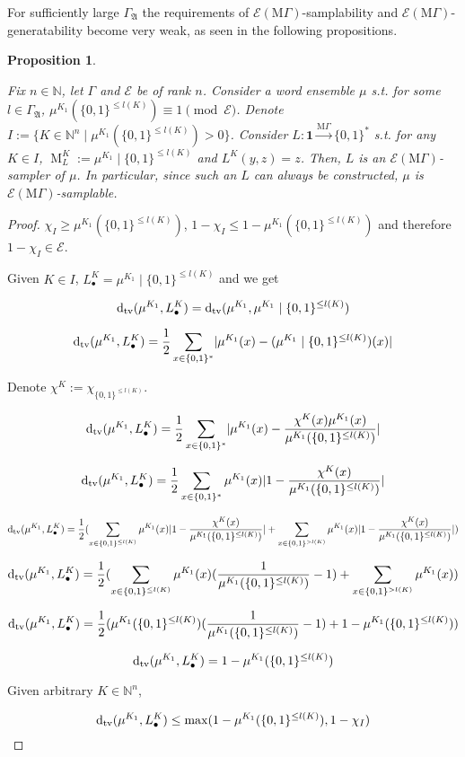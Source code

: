 \documentclass{article}
\numberwithin{equation}{section}
\theoremstyle{definition}
\theoremstyle{plain}
\newtheorem{proposition}{Proposition}[section]
\newcommand{\Bool}{\{0,1\}}
\newcommand{\Words}{{\Bool^*}}
\newcommand{\WordsLen}[1]{{\Bool^{#1}}}
\DeclareMathOperator{\M}{M}
\newcommand{\Dtv}{\operatorname{d}_{\textnormal{tv}}}
\newcommand{\Nats}{\mathbb{N}}
\newcommand{\Abs}[1]{\lvert #1 \rvert}
\newcommand{\GrowA}{\Gamma_{\mathfrak{A}}}
\newcommand{\MGrow}{\mathrm{M}\Gamma}
\newcommand{\Fall}{\mathcal{E}}
\newcommand{\MScheme}{\xrightarrow{\MGrow}}
\begin{document}
For sufficiently large $\GrowA$ the requirements of $\Fall(\MGrow)$-samplability and $\Fall(\MGrow)$-generatability become very weak, as seen in the following propositions.

\begin{samepage}
\begin{proposition}
\label{prp:adv_mgamma_smp}

Fix $n \in \Nats$, let $\Gamma$ and $\Fall$ be of rank $n$. Consider a word ensemble $\mu$ s.t. for some $l \in \GrowA$, $\mu^{K_1}(\Bool^{\leq l(K)}) \equiv 1 \pmod \Fall$. Denote ${I:=\{K \in \Nats^n \mid \mu^{K_1}(\Bool^{\leq l(K)}) > 0\}}$. Consider ${L: \bm{1} \MScheme \Words}$ s.t. for any $K \in I$, $\M_L^K:=\mu^{K_1} \mid \Bool^{\leq l(K)}$ and ${L^K(y,z)=z}$.  Then, $L$ is an $\Fall(\MGrow)$-sampler of $\mu$. In particular, since such an $L$ can always be constructed, $\mu$ is $\Fall(\MGrow)$-samplable.

\end{proposition}
\end{samepage}

\begin{proof}

$\chi_I \geq \mu^{K_1}(\Bool^{\leq l(K)})$, $1 - \chi_{I} \leq 1 - \mu^{K_1}(\Bool^{\leq l(K)})$ and therefore $1 - \chi_I \in \Fall$.

Given $K \in I$, ${L_\bullet^K = \mu^{K_1} \mid \Bool^{\leq l(K)}}$ and we get

$$\Dtv(\mu^{K_1}, L_\bullet^K) = \Dtv(\mu^{K_1}, \mu^{K_1} \mid \Bool^{\leq l(K)})$$

$$\Dtv(\mu^{K_1}, L_\bullet^K) = \frac{1}{2} \sum_{x \in \Words} \Abs{\mu^{K_1}(x)-(\mu^{K_1} \mid \WordsLen{\leq l(K)})(x)}$$

Denote $\chi^K:=\chi_{\WordsLen{\leq l(K)}}$.

$$\Dtv(\mu^{K_1}, L_\bullet^K) = \frac{1}{2} \sum_{x \in \Words} \Abs{\mu^{K_1}(x)-\frac{\chi^K(x)\mu^{K_1}(x)}{\mu^{K_1}(\WordsLen{\leq l(K)})}}$$

$$\Dtv(\mu^{K_1}, L_\bullet^K) = \frac{1}{2} \sum_{x \in \Words} \mu^{K_1}(x) \Abs{1-\frac{\chi^K(x)}{\mu^{K_1}(\Bool^{\leq l(K)})}}$$

$$\Dtv(\mu^{K_1}, L_\bullet^K) = \frac{1}{2} (\sum_{x \in \Bool^{\leq l(K)}} \mu^{K_1}(x) \Abs{1-\frac{\chi^K(x)}{\mu^{K_1}(\Bool^{\leq l(K)})}}+\sum_{x \in \Bool^{>l(K)}} \mu^{K_1}(x) \Abs{1-\frac{\chi^K(x)}{\mu^{K_1}(\Bool^{\leq l(K)})}})$$

$$\Dtv(\mu^{K_1}, L_\bullet^K) = \frac{1}{2} (\sum_{x \in \Bool^{\leq l(K)}} \mu^{K_1}(x)(\frac{1}{\mu^{K_1}(\Bool^{\leq l(K)})}-1)+\sum_{x \in \Bool^{>l(K)}} \mu^{K_1}(x))$$

$$\Dtv(\mu^{K_1}, L_\bullet^K) = \frac{1}{2} (\mu^{K_1}(\Bool^{\leq l(K)})(\frac{1}{\mu^{K_1}(\Bool^{\leq l(K)})}-1)+1 - \mu^{K_1}(\Bool^{\leq l(K)}))$$

$$\Dtv(\mu^{K_1}, L_\bullet^K) = 1-\mu^{K_1}(\Bool^{\leq l(K)})$$

Given arbitrary $K \in \Nats^n$,

$$\Dtv(\mu^{K_1}, L_\bullet^K) \leq \max(1-\mu^{K_1}(\Bool^{\leq l(K)}), 1-\chi_I)$$

\end{proof}
\end{document}
